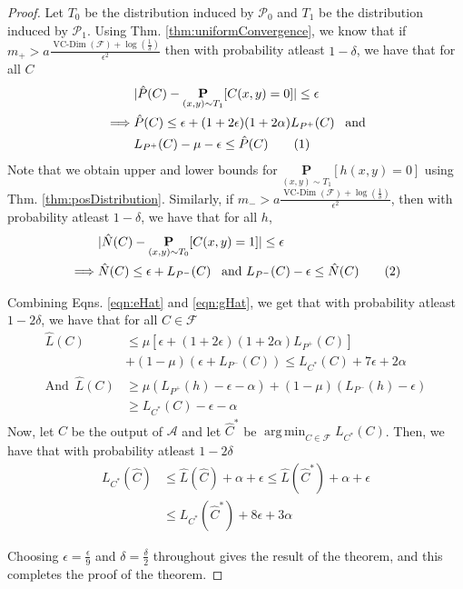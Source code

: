 \documentclass[12pt]{article}
\newcommand{\mb}{\mathbf}
\newcommand{\mc}{\mathcal}
\newcommand\numberthis{\addtocounter{equation}{1}\tag{\theequation}}
\DeclareMathOperator*{\argmin}{arg\,min}
\DeclareMathOperator*{\vcdim}{VC-Dim}
\begin{document}
\begin{proof}
Let $T_0$ be the distribution induced by $\mc P_0$ and $T_1$ be the distribution induced by $\mc P_1$. Using Thm. \ref{thm:uniformConvergence}, we know that if $m_+ > a\frac{\vcdim({\mc F}) + \log(\frac{1}{\delta})}{\epsilon^2}$ then with probability atleast $1-\delta$, we have that for all $C$
\begin{align*}
  &|\hat P(C) - \underset{(x,y) \sim T_1}{\mb P}[C(x, y) = 0]| \le \epsilon\\
  \implies &\hat P(C) \le \epsilon + (1+2\epsilon)(1+2\alpha)L_{P^+}(C) \enspace\text{ and}\\
  &L_{P^+}(C) - \mu -\epsilon \le \hat P(C) \numberthis \label{eqn:eHat}
\end{align*}
Note that we obtain upper and lower bounds for $\underset{(x,y) \sim T_1}{\mb P}[h(x, y) = 0]$ using Thm. \ref{thm:posDistribution}. Similarly, if $m_- > a\frac{\vcdim({\mc F}) + \log(\frac{1}{\delta})}{\epsilon^2}$, then with probability atleast $1-\delta$, we have that for all $h$,
\begin{align*}
  &|\hat N(C) - \underset{(x,y) \sim T_0}{\mb P}[C(x, y) = 1]| \le \epsilon\\
  \implies &\hat N(C) \le \epsilon + L_{P^-}(C) \enspace\text{ and } L_{P^-}(C) -\epsilon \le \hat N(C) \numberthis\label{eqn:gHat}
\end{align*}

\noindent Combining Eqns. \ref{eqn:eHat} and \ref{eqn:gHat}, we get that with probability atleast $1-2\delta$, we have that for all $C \in {\mc F}$
\begin{align*}
  \hat L(C) &\le \mu [\epsilon + (1+2\epsilon)(1+2\alpha)L_{P^+}(C)]\\
  &+ (1-\mu)(\epsilon + L_{P^-}(C)) \le L_{C^*}(C) + 7\epsilon + 2\alpha\\
  \text{And} \enspace \hat L(C) &\ge \mu(L_{P^+}(h) -\epsilon - \alpha) + (1-\mu)(L_{P^-}(h) - \epsilon) \\
  &\ge L_{C^*}(C) - \epsilon - \alpha
\end{align*}
Now, let $\hat C$ be the output of $\mc A$ and let $\hat C^*$ be $\argmin_{C \in {\mc F}} L_{C^*}(C)$. Then, we have that with probability atleast $1-2\delta$
\begin{align*}
  L_{C^*}(\hat C) &\le \hat L(\hat C) + \alpha + \epsilon \le \hat L(\hat C^*) + \alpha + \epsilon \\
  &\le L_{C^*}(\hat C^*) + 8\epsilon + 3\alpha 
\end{align*}

Choosing $\epsilon = \frac{\epsilon}{9}$ and $\delta = \frac{\delta}{2}$ throughout gives the result of the theorem,
and this completes the proof of the theorem.
\end{proof}
\end{document}
